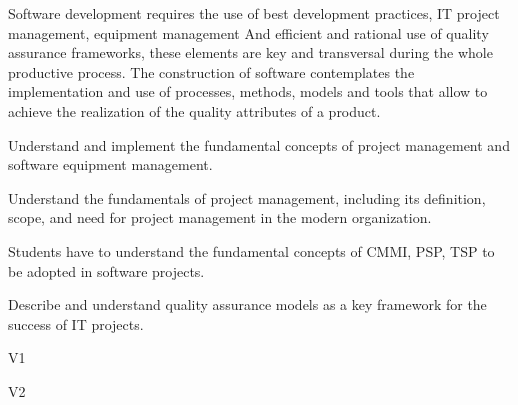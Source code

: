 \begin{syllabus}


\begin{justification}
Software development requires the use of best development practices, IT project management, equipment management
And efficient and rational use of quality assurance frameworks, these elements are key and transversal during the whole productive process.
The construction of software contemplates the implementation and use of processes, methods, models and tools that allow to achieve the realization of the quality attributes of a product.
\end{justification}

\begin{goals}
  \item Understand and implement the fundamental concepts of project management and software equipment management.
  \item Understand the fundamentals of project management, including its definition, scope, and need for project management in the modern organization.
  \item Students have to understand the fundamental concepts of CMMI, PSP, TSP to be adopted in software projects.
  \item Describe and understand quality assurance models as a key framework for the success of IT projects.
\end{goals}

\begin{outcomes}{V1}
    \item {}
    \item {}
    \item {}
    \item {}
    \item {}
    \item {}
\end{outcomes}

\begin{outcomes}{V2}
    \item {}
    \item {}
    \item {}
\end{outcomes}


\end{syllabus}
